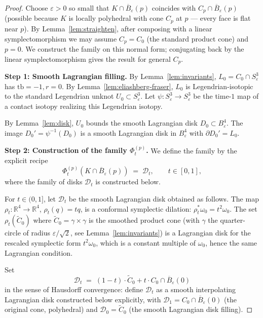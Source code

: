 \documentclass[12pt]{article}
\theoremstyle{definition}
\begin{document}
\begin{proof}
Choose $\varepsilon>0$ so small that $K\cap\overline{B}_\varepsilon(p)$ coincides with $C_p\cap\overline{B}_\varepsilon(p)$ (possible because $K$ is locally polyhedral with cone $C_p$ at $p$ — every face is flat near $p$). By Lemma~\ref{lem:straighten}, after composing with a linear symplectomorphism we may assume $C_p=C_0$ (the standard product cone) and $p=0$. We construct the family on this normal form; conjugating back by the linear symplectomorphism gives the result for general $C_p$.

\smallskip\noindent\textbf{Step 1: Smooth Lagrangian filling.}
By Lemma~\ref{lem:invariants}, $L_0=C_0\cap S^3_\varepsilon$ has $\mathrm{tb}=-1,r=0$. By Lemma~\ref{lem:eliashberg-fraser}, $L_0$ is Legendrian-isotopic to the standard Legendrian unknot $U_0\subset S^3_\varepsilon$. Let $\psi:S^3_\varepsilon\to S^3_\varepsilon$ be the time-$1$ map of a contact isotopy realizing this Legendrian isotopy.

By Lemma~\ref{lem:disk}, $U_0$ bounds the smooth Lagrangian disk $D_0\subset B^4_\varepsilon$. The image $D_0'=\psi^{-1}(D_0)$ is a smooth Lagrangian disk in $B^4_\varepsilon$ with $\partial D_0'=L_0$.

\smallskip\noindent\textbf{Step 2: Construction of the family $\Phi_t^{(p)}$.}
We define the family by the explicit recipe
\begin{equation}\label{eq:family}
\Phi_t^{(p)}(K\cap\overline{B}_\varepsilon(p)) \;=\; \mathcal{D}_t,\qquad t\in[0,1],
\end{equation}
where the family of disks $\mathcal{D}_t$ is constructed below.

For $t\in(0,1]$, let $\mathcal{D}_t$ be the smooth Lagrangian disk obtained as follows. The map $\rho_t:\mathbb{R}^4\to\mathbb{R}^4$, $\rho_t(q)=tq$, is a conformal symplectic dilation: $\rho_t^*\omega_0=t^2\omega_0$. The set $\rho_t(\widetilde{C}_0)$ where $\widetilde{C}_0=\gamma\times\gamma$ is the smoothed product cone (with $\gamma$ the quarter-circle of radius $\varepsilon/\sqrt{2}$, see Lemma~\ref{lem:invariants}) is a Lagrangian disk for the rescaled symplectic form $t^2\omega_0$, which is a constant multiple of $\omega_0$, hence the same Lagrangian condition.

Set
\begin{equation}\label{eq:Dt}
\mathcal{D}_t \;=\; (1-t)\cdot\widetilde{C}_0 + t\cdot C_0\cap\overline{B}_\varepsilon(0)
\end{equation}
in the sense of Hausdorff convergence: define $\mathcal{D}_t$ as a smooth interpolating Lagrangian disk constructed below explicitly, with $\mathcal{D}_1=C_0\cap\overline{B}_\varepsilon(0)$ (the original cone, polyhedral) and $\mathcal{D}_0=\widetilde{C}_0$ (the smooth Lagrangian disk filling).


\end{proof}
\end{document}
